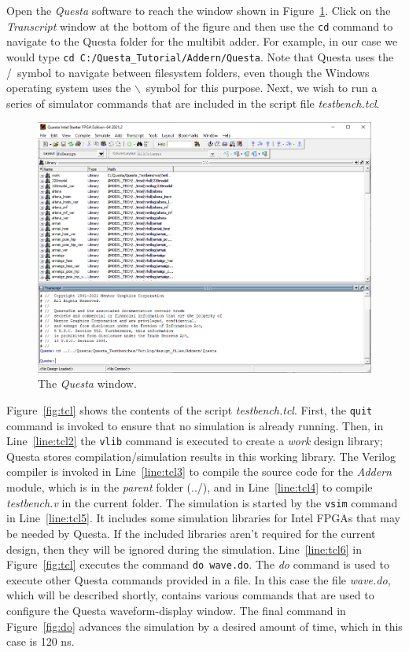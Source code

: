 \documentclass[11pt, twoside, pdftex]{article}
\begin{document}
\noindent
Open the {\it Questa} software to reach the window shown in Figure~\ref{fig:gui1}.
Click on the {\it Transcript} window at the bottom of the figure and then use the
\texttt{cd} command to navigate to the Questa folder for the multibit adder. For 
example, in our case we would type \texttt{cd C:/Questa\_Tutorial/Addern/Questa}. 
Note that Questa uses the /~symbol to navigate between filesystem folders, even though 
the Windows operating system uses the $\backslash$~symbol for this purpose.
Next, we wish to run a series of simulator commands that are included in the script file
{\it testbench.tcl}. 

\newpage
\begin{figure}[t]
	\begin{center}
		\includegraphics[width = .9\textwidth]{figures/gui1.png}
	\end{center}
		  \caption{The {\it Questa} window.}
	\label{fig:gui1}
\end{figure}

\noindent
Figure~\ref{fig:tcl} shows the contents of the script {\it testbench.tcl}. First, the
\texttt{quit} command is invoked to ensure that no simulation is already running. Then, in
Line~\ref{line:tcl2} the \texttt{vlib} command is executed to create a {\it work} design
library; Questa stores compilation/simulation results in this working library.   
The Verilog compiler is invoked in Line~\ref{line:tcl3} to
compile the source code for the {\it Addern} module, which is in the {\it parent} folder (../),  
and in Line~\ref{line:tcl4} to compile {\it testbench.v} in the current folder.
The simulation is started by the \texttt{vsim} command in Line~\ref{line:tcl5}. It includes some
simulation libraries for Intel FPGAs that may be needed by Questa.
If the included libraries aren't required for the current
design, then they will be ignored during the simulation. 
Line~\ref{line:tcl6} in Figure~\ref{fig:tcl} executes the command \texttt{do~wave.do}.
The {\it do} command is used to execute other Questa commands provided in a file. In
this case the file {\it wave.do}, which will be described shortly, contains various commands
that are used to configure the Questa waveform-display window. The final command in 
Figure~\ref{fig:do} advances the simulation by a desired amount of time, which in 
this case is 120 ns.
\end{document}
